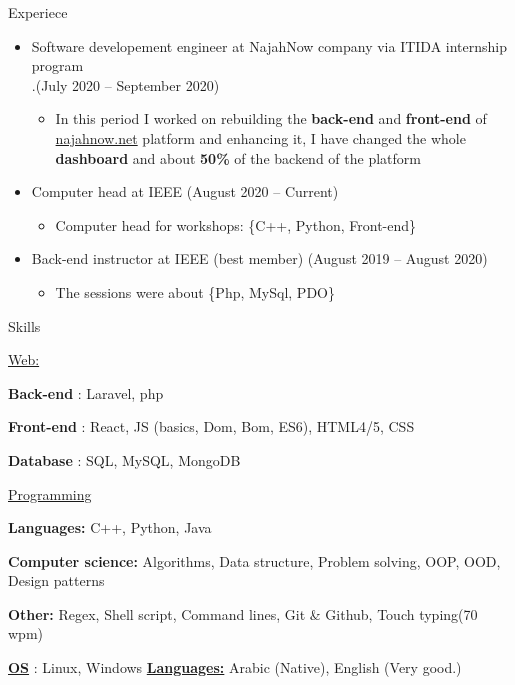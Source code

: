 \documentclass{resume}
\begin{document}
\begin{rSection}{Experiece}
\begin{itemize}
        \item Software developement engineer at NajahNow company via ITIDA internship program \\ 
        .\hfill{(July 2020 – September 2020)}
        \begin{itemize}
            \item In this period I worked on rebuilding the \textbf{back-end} and \textbf{front-end} of \href{https://najahnow.net}{najahnow.net} platform and enhancing it,
            I have changed the whole \textbf{dashboard} and about \textbf{50\%} of the backend of the platform  
        \end{itemize}
        \item Computer head at IEEE \hfill{(August 2020 – Current)}
        \begin{itemize}
            \item Computer head for workshops: \{C++, Python, Front-end\}
        \end{itemize}
        \item Back-end instructor at IEEE (best member) \hfill{(August 2019 – August 2020)}
        \begin{itemize}
            \item The sessions were about \{Php, MySql, PDO\}
        \end{itemize}
    \end{itemize}
\end{rSection}

\clearpage


\begin{rSection}{Skills}
    \begin{rSubsection}{\underline{Web:}}{}{}{}
        \item \textbf{Back-end}  : Laravel, php
        \item \textbf{Front-end} : React, JS (basics, Dom, Bom, ES6), HTML4/5, CSS
        \item \textbf{Database}  : SQL, MySQL, MongoDB
    \end{rSubsection}

    \begin{rSubsection}{\underline{Programming}}{}{}{}
        \item \textbf{Languages:} C++, Python, Java
        \item \textbf{Computer science:} Algorithms, Data structure, Problem solving, OOP, OOD, Design patterns
        \item \textbf{Other:} Regex, Shell script, Command lines, Git \& Github, Touch typing(70 wpm)
    \end{rSubsection}

    \underline{\bf OS} : Linux, Windows
    \hfill \underline{\bf Languages:} Arabic (Native), English (Very good.) 
\end{rSection}
\end{document}
